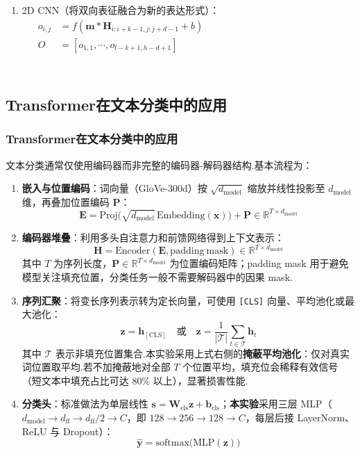 \documentclass{模版}
\begin{document}
\begin{frame}
\begin{columns}
\begin{enumerate}
\begin{align*}
    \symbf{h}_{t} &= \symbf{o}_{t} \odot \tanh(\symbf{c}_{t})\\
    \symbf{h}_{i} &= \left[\overrightarrow{\symbf{h}_{i}}\oplus\overleftarrow{\symbf{h}_{i}}\right]
\end{align*}
        \item  2D CNN（将双向表征融合为新的表达形式）：
        \begin{align*}
            o_{i,j} &= f\left(\symbf{m}*\symbf{H}_{i:i+k-1,j:j+d-1}+b\right)\\
            O &= \left[ o_{1,1}, \cdots, o_{l-k+1,h-d+1}\right]
        \end{align*}
    \end{enumerate}
    \end{columns}
\end{frame}
\subsection{Transformer在文本分类中的应用}
\begin{frame}\frametitle{Transformer在文本分类中的应用}
\fontsize{8pt}{10pt}\selectfont
文本分类通常仅使用编码器而非完整的编码器-解码器结构.基本流程为：
\begin{enumerate}
    \item \textbf{嵌入与位置编码}：词向量（GloVe-300d）按 $\sqrt{d_{\mathrm{model}}}$ 缩放并线性投影至 $d_{\mathrm{model}}$ 维，再叠加位置编码 $\symbf{P}$：
    \[
        \symbf{E}=\mathrm{Proj}\!\big(\sqrt{d_{\mathrm{model}}}\,\mathrm{Embedding}(\symbf{x})\big)+\symbf{P}\in\mathbb{R}^{T\times d_{\mathrm{model}}}
    \]
    \item \textbf{编码器堆叠}：利用多头自注意力和前馈网络得到上下文表示：
    \[
        \symbf{H}=\mathrm{Encoder}(\symbf{E}, \mathrm{padding\ mask})\in\mathbb{R}^{T\times d_{\mathrm{model}}}
    \]
    其中 $T$ 为序列长度，$\symbf{P}\in\mathbb{R}^{T\times d_{\mathrm{model}}}$ 为位置编码矩阵；padding mask 用于避免模型关注填充位置，分类任务一般不需要解码器中的因果 mask.
    \item \textbf{序列汇聚}：将变长序列表示转为定长向量，可使用 \texttt{[CLS]} 向量、平均池化或最大池化：
    \[
        \symbf{z}=\symbf{h}_{\mathrm{[CLS]}}\quad \text{或}\quad
        \symbf{z}=\frac{1}{|\mathcal{T}|}\sum_{t\in\mathcal{T}}\symbf{h}_t
    \]
    其中 $\mathcal{T}$ 表示非填充位置集合.本实验采用上式右侧的\textbf{掩蔽平均池化}：仅对真实词位置取平均.若不加掩蔽地对全部 $T$ 个位置平均，填充位会稀释有效信号（短文本中填充占比可达 80\% 以上），显著损害性能.
    \item \textbf{分类头}：标准做法为单层线性 $\symbf{s}=\symbf{W}_{\mathrm{cls}}\symbf{z}+\symbf{b}_{\mathrm{cls}}$；\textbf{本实验}采用三层 MLP（$d_{\mathrm{model}}\!\to\!d_{\mathrm{ff}}\!\to\!d_{\mathrm{ff}}/2\!\to\!C$，即 $128\!\to\!256\!\to\!128\!\to\!C$，每层后接 LayerNorm、ReLU 与 Dropout）：
    \[
        \hat{\symbf{y}}=\mathrm{softmax}\!\big(\mathrm{MLP}(\symbf{z})\big)
    \]
\end{enumerate}
\end{frame}
\end{document}
